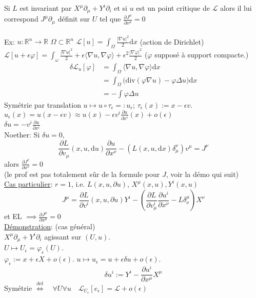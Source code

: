 \documentclass[a4paper,11pt]{article}
\renewcommand{\d}{{\mathrm{d}}}
\newcommand{\dr}[2]{\frac{\partial {#1}}{\partial{#2}}}
\begin{document}
Si $L$ est invariant par $X^\mu\partial_\mu + Y^i\partial_i$ et si $u$ est un point critique de $\mathcal{L}$ alors il lui correspond $J^\mu\partial_\mu$ définit sur $U$ tel que $\dr {J^\mu}{x^\mu}=0$\\
\\
Ex: $u: \mathbb{R}^n \to \mathbb{R}$ \quad\quad $\Omega\subset \mathbb{R}^n$
\quad \quad $\mathcal{L}[u]=\int_{\Omega} \frac{|\nabla u|^2}2 \d x$ (action de Dirichlet)\\
$\mathcal{L}[u+\epsilon\varphi] = \int_\omega \frac{|\nabla u|^2}2 + \epsilon \langle\nabla u, \nabla \varphi\rangle + \epsilon^2 \frac{|\nabla \varphi|^2}2$
 ($\varphi$ supposé à support compacte.)
\begin{align*}
\delta \mathcal{L}_u[\varphi] &= \int_\Omega \langle\nabla u, \nabla \varphi\rangle \d x\\
&= \int_\Omega \big(\mathrm{div}(\varphi\nabla u) - \varphi \Delta u\big) \d x\\
&=- \int \varphi \Delta u
\end{align*}
Symétrie par translation $u \mapsto u\circ \tau_\epsilon =: u_\epsilon$; $\tau_\epsilon (x) := x-\epsilon v$.\\
$u_\epsilon(x) = u(x-\epsilon v) \approx u(x) - \epsilon v^i \dr u {x^i}(x) + o(\epsilon)$\\
$\delta u = - v^i \dr u {x^i}$\\
Noether: Si $\delta u = 0$, 
$$\dr L {v_\mu} (x,u,\d u) \dr u {x^\nu} - (L(x,u, \d x) \delta_\mu^\nu) v^\mu = J^\nu$$
alors $\dr{J^\nu}{x^\nu} = 0$\\
(le prof est pas totalement sûr de la formule pour $J$, voir la démo qui suit)\\
\underline{Cas particulier}:
$r=1$, i.e. $L(x,u,\partial u)$, $X^\mu (x,u), Y^i(x,u)$
$$J^\mu = \dr L {v^i} (x,u,\partial u) Y^i - \left(\dr L {v^i_\mu} \dr{u^i}{x^\nu} - L \delta_\nu^\mu\right) X^\nu$$
et EL $\implies \dr{J^\mu}{x^\mu}=0$\\
\underline{Démonstration}: (cas général)\\
$X^\mu \partial_\mu + Y^i \partial_i$ agissant sur $(U,u)$.\\
$U\mapsto U_\epsilon=\varphi_\epsilon(U)$.\\
$\varphi_\epsilon := x + \epsilon X + o(\epsilon)$.
$u\mapsto u_\epsilon = u + \epsilon \delta u + o(\epsilon)$.
$$\delta u^i := Y^i - \dr{u^i}{x^\mu}X^\mu$$
Symétrie $\overset{\mathrm{def}}{\iff} \quad \forall U \forall u \quad \mathcal{L}_{U_\epsilon}[e_\epsilon] = \mathcal{L} + o(\epsilon)$\\
\end{document}
